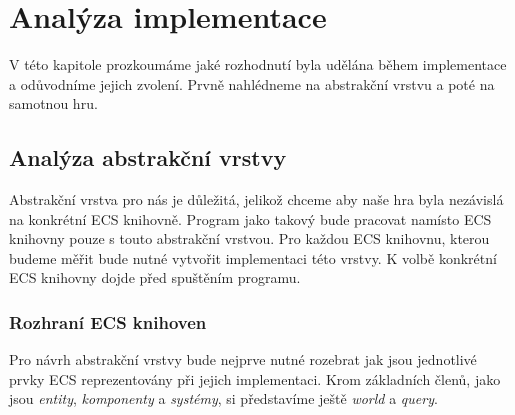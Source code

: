\chapter{Analýza implementace}
V této kapitole prozkoumáme jaké rozhodnutí byla udělána během implementace a odůvodníme jejich zvolení. Prvně nahlédneme na abstrakční vrstvu a poté na samotnou hru.

\section{Analýza abstrakční vrstvy}
Abstrakční vrstva pro nás je důležitá, jelikož chceme aby naše hra byla nezávislá na konkrétní ECS knihovně. Program jako takový bude pracovat namísto ECS knihovny pouze s touto abstrakční vrstvou. Pro každou ECS knihovnu, kterou budeme měřit bude nutné vytvořit implementaci této vrstvy. K volbě konkrétní ECS knihovny dojde před spuštěním programu.

\subsection{Rozhraní ECS knihoven}
Pro návrh abstrakční vrstvy bude nejprve nutné rozebrat jak jsou jednotlivé prvky ECS reprezentovány při jejich implementaci. Krom základních členů, jako jsou \textit{entity}, \textit{komponenty} a \textit{systémy}, si představíme ještě \textit{world} a \textit{query}.

